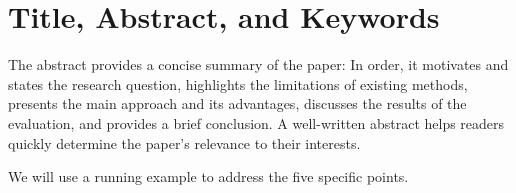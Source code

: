 
\chapter{Title, Abstract, and Keywords}
\label{ch:abstract}

The abstract provides a concise summary of the paper:
In order, it motivates and states the research question, highlights the limitations of existing methods, presents the main approach and its advantages, discusses the results of the evaluation, and provides a brief conclusion.
A well-written abstract helps readers quickly determine the paper's relevance to their interests.

We will use a running example to address the five specific points.








